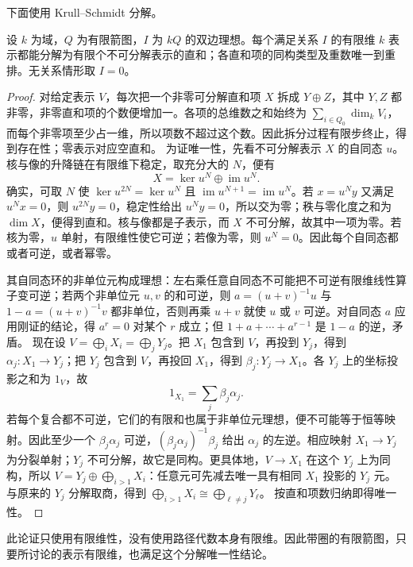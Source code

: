 下面使用 Krull--Schmidt 分解。
\begin{proposition}\label{b5:thm:quiver-krull-schmidt}
	设 \(k\) 为域，\(Q\) 为有限箭图，\(I\) 为 \(kQ\) 的双边理想。每个满足关系 \(I\) 的有限维 \(k\) 表示都能分解为有限个不可分解表示的直和；各直和项的同构类型及重数唯一到重排。无关系情形取 \(I=0\)。
\end{proposition}
\begin{proof}
	对给定表示 \(V\)，每次把一个非零可分解直和项 \(X\) 拆成 \(Y\oplus Z\)，其中 \(Y,Z\) 都非零，非零直和项的个数便增加一。各项的总维数之和始终为 \(\sum_{i\in Q_0}\dim_kV_i\)，而每个非零项至少占一维，所以项数不超过这个数。因此拆分过程有限步终止，得到存在性；零表示对应空直和。 为证唯一性，先看不可分解表示 \(X\) 的自同态 \(u\)。核与像的升降链在有限维下稳定，取充分大的 \(N\)，便有
	\[
		X=\ker u^N\oplus\operatorname{im}u^N.
	\]
	确实，可取 \(N\) 使 \(\ker u^{2N}=\ker u^N\) 且 \(\operatorname{im}u^{N+1}=\operatorname{im}u^N\)。若 \(x=u^Ny\) 又满足 \(u^Nx=0\)，则 \(u^{2N}y=0\)，稳定性给出 \(u^Ny=0\)，所以交为零；秩与零化度之和为 \(\dim X\)，便得到直和。核与像都是子表示，而 \(X\) 不可分解，故其中一项为零。若核为零，\(u\) 单射，有限维性使它可逆；若像为零，则 \(u^N=0\)。因此每个自同态都或者可逆，或者幂零。

	其自同态环的非单位元构成理想：左右乘任意自同态不可能把不可逆有限维线性算子变可逆；若两个非单位元 \(u,v\) 的和可逆，则 \(a=(u+v)^{-1}u\) 与 \(1-a=(u+v)^{-1}v\) 都非单位，否则再乘 \(u+v\) 就使 \(u\) 或 \(v\) 可逆。对自同态 \(a\) 应用刚证的结论，得 \(a^r=0\) 对某个 \(r\) 成立；但 \(1+a+\cdots+a^{r-1}\) 是 \(1-a\) 的逆，矛盾。 现在设 \(V=\bigoplus_iX_i=\bigoplus_jY_j\)。把 \(X_1\) 包含到 \(V\)，再投到 \(Y_j\)，得到 \(\alpha_j:X_1\to Y_j\)；把 \(Y_j\) 包含到 \(V\)，再投回 \(X_1\)，得到 \(\beta_j:Y_j\to X_1\)。各 \(Y_j\) 上的坐标投影之和为 \(1_V\)，故
	\[
		1_{X_1}=\sum_j\beta_j\alpha_j.
	\]
	若每个复合都不可逆，它们的有限和也属于非单位元理想，便不可能等于恒等映射。因此至少一个 \(\beta_j\alpha_j\) 可逆，\((\beta_j\alpha_j)^{-1}\beta_j\) 给出 \(\alpha_j\) 的左逆。相应映射 \(X_1\to Y_j\) 为分裂单射；\(Y_j\) 不可分解，故它是同构。更具体地，\(V\to X_1\) 在这个 \(Y_j\) 上为同构，所以 \(V=Y_j\oplus\bigoplus_{i>1}X_i\)：任意元可先减去唯一具有相同 \(X_1\) 投影的 \(Y_j\) 元。与原来的 \(Y_j\) 分解取商，得到 \(\bigoplus_{i>1}X_i\cong\bigoplus_{\ell\ne j}Y_\ell\)。 按直和项数归纳即得唯一性。
\end{proof}
此论证只使用有限维性，没有使用路径代数本身有限维。因此带圈的有限箭图，只要所讨论的表示有限维，也满足这个分解唯一性结论。

